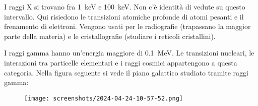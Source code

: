 I raggi X si trovano fra \SI{1}{keV} e \SI{100}{keV}. Non c'è identità di vedute su questo intervallo. Qui risiedono le transizioni atomiche profonde di atomi pesanti e il frenamento di elettroni. Vengono usati per le radiografie (trapassano la maggior parte della materia) e le cristallografie (studiare i reticoli cristallini).

I raggi gamma hanno un'energia maggiore di \SI{0.1}{MeV}. Le transizioni nucleari, le interazioni tra particelle elementari e i raggi cosmici appartengono a questa categoria. Nella figura seguente si vede il piano galattico studiato tramite raggi gamma:
\begin{figure}[H]
	\centering
	\texttt{[image: screenshots/2024-04-24-10-57-52.png]}
\end{figure}